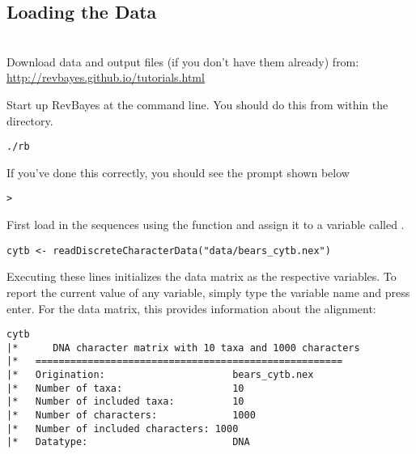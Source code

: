 \bigskip

\subsection{Loading the Data}

\noindent \\ \impmark Download data and output files (if you don't have them already) from: \\ \href{http://revbayes.github.io/tutorials.html}{http://revbayes.github.io/tutorials.html} \par

Start up RevBayes at the command line. You should do this from within the  directory.
{\tt \begin{snugshade*}
\begin{lstlisting}
./rb
\end{lstlisting}
\end{snugshade*}}

If you've done this correctly, you should see the prompt shown below
{\tt \begin{snugshade*}
\begin{lstlisting}
>
\end{lstlisting}
\end{snugshade*}}


First load in the sequences using the  function and assign it to a variable called . 

{\tt \begin{snugshade*}
\begin{lstlisting}
cytb <- readDiscreteCharacterData("data/bears_cytb.nex") 
\end{lstlisting}
\end{snugshade*}}
Executing these lines initializes the data matrix as the respective \Rev variables. 
To report the current value of any variable, simply type the variable name and press enter. For the  data matrix, this provides information about the alignment:
{\tt \begin{snugshade*}
\begin{lstlisting}
cytb
|*      DNA character matrix with 10 taxa and 1000 characters
|*   =====================================================
|*   Origination:                      bears_cytb.nex
|*   Number of taxa:                   10
|*   Number of included taxa:          10
|*   Number of characters:             1000
|*   Number of included characters: 1000
|*   Datatype:                         DNA
\end{lstlisting}
\end{snugshade*}}


